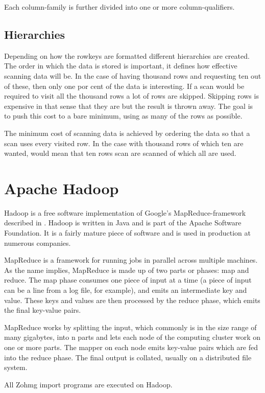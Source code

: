 \documentclass[a4paper,10pt]{book}
\begin{document}
Each column-family is further divided into one or more column-qualifiers.


\subsection{Hierarchies}

Depending on how the rowkeys are formatted different hierarchies are
created. The order in which the data is stored is important, it defines how
effective scanning data will be. In the case of having thousand rows and
requesting ten out of these, then only one por cent of the data is
interesting. If a scan would be required to visit all the thousand rows a
lot of rows are skipped. Skipping rows is expensive in that sense that they
are but the result is thrown away. The goal is to push this cost to a bare
minimum, using as many of the rows as possible.

The minimum cost of scanning data is achieved by ordering the data so that
a scan uses every visited row. In the case with thousand rows of which ten
are wanted, would mean that ten rows scan are scanned of which all are
used.


\section{Apache Hadoop}

Hadoop is a free software implementation of Google's MapReduce-framework
described in \cite{mapreduce}. Hadoop is written in Java and is part of
the Apache Software Foundation.  It is a fairly mature piece of software
and is used in production at numerous companies. \cite{hadoop}

MapReduce is a framework for running jobs in parallel across multiple
machines. As the name implies, MapReduce is made up of two parts or
phases: map and reduce. The map phase consumes one piece of input at a
time (a piece of input can be a line from a log file, for example), and
emits an intermediate key and value. These keys and values are then
processed by the reduce phase, which emits the final key-value pairs.

MapReduce works by splitting the input, which commonly is in the size
range of many gigabytes, into n parts and lets each node of the computing
cluster work on one or more parts. The mapper on each node emits key-value
pairs which are fed into the reduce phase. The final output is collated,
usually on a distributed file system.

All Zohmg import programs are executed on Hadoop.
\end{document}
